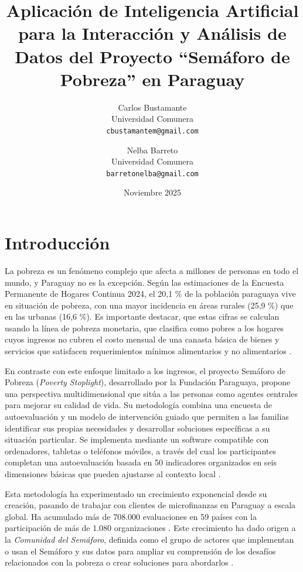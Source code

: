 \documentclass{article}
\begin{document}
\hyphenation{}

\title{Aplicación de Inteligencia Artificial para la Interacción y Análisis de Datos del Proyecto “Semáforo de Pobreza” en Paraguay}

\author{
  Carlos Bustamante \\
  Universidad Comunera \\
  \texttt{cbustamantem@gmail.com}
  \and
  Nelba Barreto \\
  Universidad Comunera \\
  \texttt{barretonelba@gmail.com}
}

\date{Noviembre 2025}
\maketitle

\section{Introducción}\label{sec:introduccion}
La pobreza es un fenómeno complejo que afecta a millones de personas en todo el mundo, y Paraguay no es la excepción. Según las estimaciones de la Encuesta Permanente de Hogares Continua 2024, el 20,1 \% de la población paraguaya vive en situación de pobreza, con una mayor incidencia en áreas rurales (25,9 \%) que en las urbanas (16,6 \%). Es importante destacar, que estas cifras se calculan usando la línea de pobreza monetaria, que clasifica como pobres a los hogares cuyos ingresos no cubren el costo mensual de una canasta básica de bienes y servicios que satisfacen requerimientos mínimos alimentarios y no alimentarios \cite{INE2024_pobreza}.

En contraste con este enfoque limitado a los ingresos, el proyecto Semáforo de Pobreza (\textit{Poverty Stoplight}), desarrollado por la Fundación Paraguaya, propone una perspectiva multidimensional que sitúa a las personas como agentes centrales para mejorar su calidad de vida. Su metodología combina una encuesta de autoevaluación y un modelo de intervención guiado que permiten a las familias identificar sus propias necesidades y desarrollar soluciones específicas a su situación particular. Se implementa mediante un software compatible con ordenadores, tabletas o teléfonos móviles, a través del cual los participantes completan una autoevaluación basada en 50 indicadores organizados en seis dimensiones básicas que pueden ajustarse al contexto local \cite{ManualSemaforo2023}.

Esta metodología ha experimentado un crecimiento exponencial desde su creación, pasando de trabajar con clientes de microfinanzas en Paraguay a escala global. Ha acumulado más de 708.000 evaluaciones en 59 países con la participación de más de 1.080 organizaciones \cite{povertyStoplightStats}. Este crecimiento ha dado origen a la \textit{Comunidad del Semáforo}, definida como el grupo de actores que implementan o usan el Semáforo y sus datos para ampliar su comprensión de los desafíos relacionados con la pobreza o crear soluciones para abordarlos \cite[p.~14]{ManualSemaforo2023}.
\end{document}
